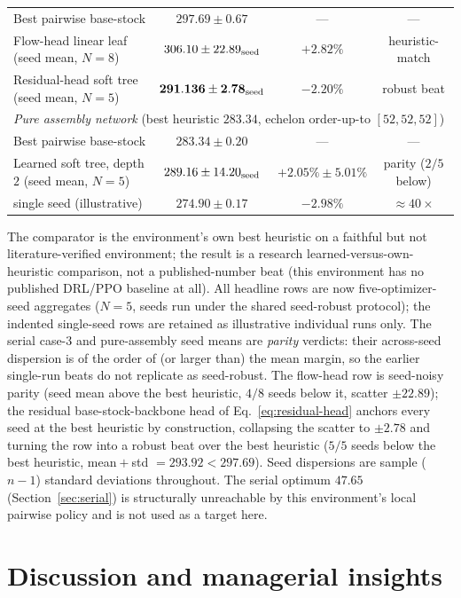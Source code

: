 \documentclass[11pt]{article}
\begin{document}
\begin{table}[!htbp]
\begin{tabular}{lccc}
Best pairwise base-stock                        & $297.69\pm0.67$ & --- & --- \\
Flow-head linear leaf (seed mean, $N=8$)       & $306.10\pm22.89_{\rm seed}$ & $+2.82\%$ & heuristic-match \\
Residual-head soft tree (seed mean, $N=5$)     & $\mathbf{291.136\pm2.78_{\rm seed}}$ & $\mathbf{-2.20\%}$ & robust beat \\
\midrule
\multicolumn{4}{l}{\emph{Pure assembly network} (best heuristic $283.34$, echelon order-up-to $[52,52,52]$)} \\
Best pairwise base-stock                        & $283.34\pm0.20$ & --- & --- \\
Learned soft tree, depth $2$ (seed mean, $N=5$) & $289.16\pm14.20_{\rm seed}$ & $+2.05\%\pm5.01\%$ & parity ($2/5$ below) \\
\quad single seed (illustrative)                 & $274.90\pm0.17$ & $-2.98\%$ & $\approx 40\times$ \\
\bottomrule
\end{tabular}
\par\medskip\footnotesize The comparator is the environment's own best heuristic on a faithful but
not literature-verified environment; the result is a research learned-versus-own-heuristic
comparison, not a published-number beat (this environment has no published DRL/PPO baseline at all).
All headline rows are now five-optimizer-seed aggregates ($N{=}5$, seeds run under the shared
seed-robust protocol); the indented single-seed rows are retained as illustrative individual runs
only. The serial case-3 and pure-assembly seed means are \emph{parity} verdicts: their across-seed
dispersion is of the order of (or larger than) the mean margin, so the earlier single-run beats do
not replicate as seed-robust. The flow-head row is seed-noisy parity (seed
mean above the best heuristic, $4/8$ seeds below it, scatter $\pm22.89$); the residual base-stock-backbone head of
Eq.~\eqref{eq:residual-head} anchors every seed at the best heuristic by construction, collapsing the scatter to
$\pm2.78$ and turning the row into a robust beat over the best heuristic ($5/5$ seeds below the best heuristic, mean${}+{}$std
$=293.92<297.69$). Seed dispersions are sample ($n{-}1$) standard deviations throughout. The serial optimum $47.65$ (Section~\ref{sec:serial}) is structurally
unreachable by this environment's local pairwise policy and is not used as a target here.
\end{table}
\FloatBarrier


\section{Discussion and managerial insights}
\label{sec:discussion}
\end{document}
